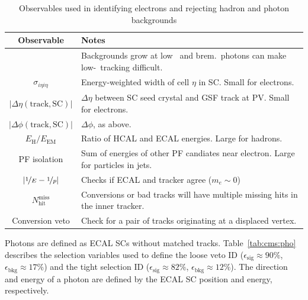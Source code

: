 \begin{table}
	\begin{center}
		\caption{Observables used in identifying electrons and rejecting hadron and photon backgrounds}
		\label{tab:cms:el}
		\begin{tabular}{c|p{}}
			Observable & Notes \\ 
			\hline
			\hline
			\pt & Backgrounds grow at low \pt~and brem.~photons can make low-\pt~tracking difficult. \\ \hline
			$\sigma_{i\eta i\eta}$  & Energy-weighted width of cell $\eta$ in SC. Small for electrons. \\ \hline
			$|\Delta\eta(\mathrm{track,SC})|$  & $\Delta\eta$ between SC seed crystal and GSF track at PV. Small for electrons.  \\ \hline
			$|\Delta\phi(\mathrm{track,SC})|$  & $\Delta\phi$, as above.\\ \hline
			$E_\mathrm{H}/E_\mathrm{EM}$  & Ratio of HCAL and ECAL energies. Large for hadrons. \\ \hline
			PF isolation & Sum of energies of other PF candiates near electron. Large for particles in jets. \\ \hline
			$|\nicefrac{1}{E}-\nicefrac{1}{p}|$ & Checks if ECAL and tracker agree ($m_e\sim0$) \\ \hline
			$N_\mathrm{hit}^\mathrm{miss}$ & Conversions or bad tracks will have multiple missing hits in the inner tracker.\\ \hline
			Conversion veto & Check for a pair of tracks originating at a displaced vertex.\\ 
		\end{tabular}
	\end{center}
\end{table}

Photons are defined as ECAL SCs without matched tracks. 
Table~\ref{tab:cms:pho} describes the selection variables used to define the loose veto ID ($\epsilon_\mathrm{sig}\approx90\%$, $\epsilon_\mathrm{bkg}\approx17\%$) and the tight selection ID ($\epsilon_\mathrm{sig}\approx82\%$, $\epsilon_\mathrm{bkg}\approx12\%$).
The direction and energy of a photon are defined by the ECAL SC position and energy, respectively.

